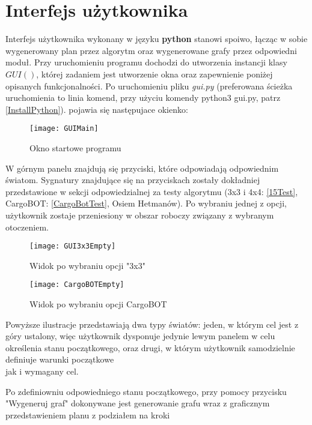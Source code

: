 \section{Interfejs użytkownika}
    \label{GUIRozdzial}
    Interfejs użytkownika wykonany w języku \textbf{python} stanowi spoiwo, łącząc w sobie wygenerowany plan przez algorytm oraz wygenerowane grafy przez 
    odpowiedni moduł. Przy uruchomieniu programu dochodzi do utworzenia instancji klasy $GUI()$, której zadaniem jest utworzenie okna oraz zapewnienie 
    poniżej opisanych funkcjonalności.
    Po uruchomieniu pliku \textit{gui.py} (preferowana ścieżka uruchomienia to linia komend, przy użyciu komendy python3 gui.py, patrz \ref{InstallPython}).
    pojawia się następujace okienko:
    \begin{figure}[H]
        \texttt{[image: GUIMain]}
        \centering
        \caption{Okno startowe programu}
    \end{figure}

    W górnym panelu znajdują się przyciski, które odpowiadają odpowiednim światom. Sygnatury znajdujące się na przyciskach zostały 
    dokładniej przedstawione w sekcji odpowiedzialnej za testy algorytmu (3x3 i 4x4: \ref{15Test}, CargoBOT: \ref{CargoBotTest}, 
    Osiem Hetmanów). Po wybraniu jednej z opcji, użytkownik zostaje przeniesiony w obszar roboczy związany z wybranym
    otoczeniem.

    \begin{figure}[H]
        \texttt{[image: GUI3x3Empty]}
        \centering
        \caption{Widok po wybraniu opcji "3x3"}
    \end{figure}

    \begin{figure}[H]
        \texttt{[image: CargoBOTEmpty]}
        \centering
        \caption{Widok po wybraniu opcji CargoBOT}
    \end{figure}

    Powyższe ilustracje przedstawiają dwa typy światów: jeden, w którym cel jest z góry ustalony, więc użytkownik dysponuje jedynie lewym panelem w 
    celu określenia stanu początkowego, oraz drugi, w którym użytkownik samodzielnie definiuje warunki początkowe\\
    jak i wymagany cel.

    Po zdefiniowniu odpowiedniego stanu początkowego, przy pomocy przycisku "Wygeneruj graf" dokonywane jest generowanie grafu wraz z graficznym 
    przedstawieniem planu z podziałem na kroki

